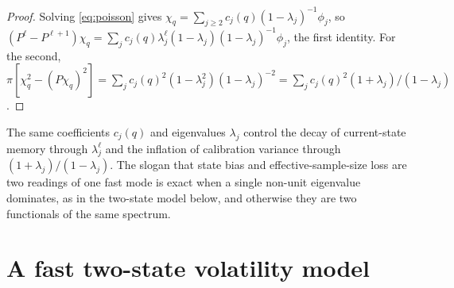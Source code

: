 \documentclass[11pt]{article}
\theoremstyle{definition}
\theoremstyle{remark}
\begin{document}
\begin{proof}
Solving \eqref{eq:poisson} gives $\chi_q=\sum_{j\ge2}c_j(q)(1-\lambda_j)^{-1}\phi_j$, so
$(P^\ell-P^{\ell+1})\chi_q=\sum_j c_j(q)\lambda_j^\ell(1-\lambda_j)(1-\lambda_j)^{-1}\phi_j$,
the first identity. For the second, $\pi[\chi_q^2-(P\chi_q)^2]=\sum_j
c_j(q)^2(1-\lambda_j^2)(1-\lambda_j)^{-2}=\sum_j c_j(q)^2(1+\lambda_j)/(1-\lambda_j)$.
\end{proof}

The same coefficients $c_j(q)$ and eigenvalues $\lambda_j$ control the decay of current-state
memory through $\lambda_j^\ell$ and the inflation of calibration variance through
$(1+\lambda_j)/(1-\lambda_j)$. The slogan that state bias and effective-sample-size loss are
two readings of one fast mode is exact when a single non-unit eigenvalue dominates, as in the
two-state model below, and otherwise they are two functionals of the same spectrum.

\section{A fast two-state volatility model}\label{sec:twostate}
\end{document}
